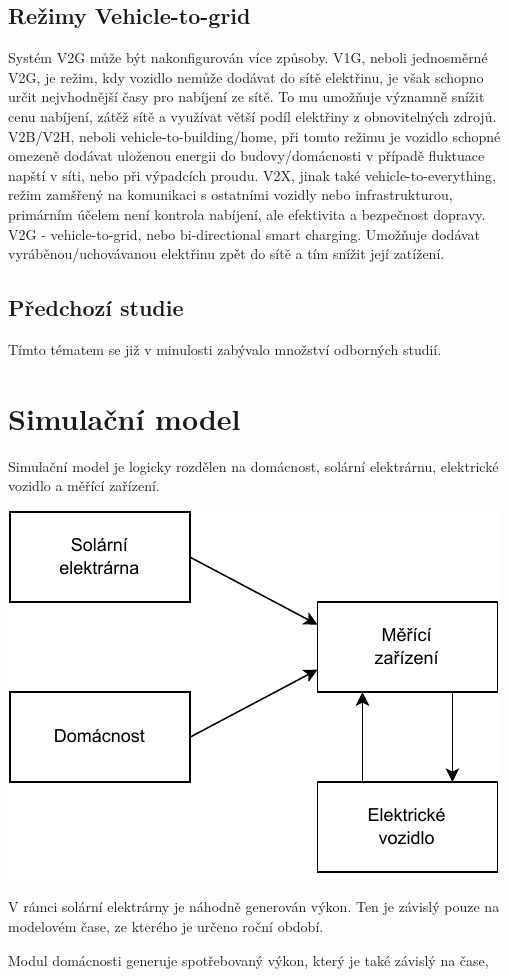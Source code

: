 \documentclass[12pt,a4paper]{article}
\begin{document}
\subsection{Režimy Vehicle-to-grid}
Systém V2G může být nakonfigurován více způsoby.
V1G, neboli jednosměrné V2G, je režim, kdy vozidlo nemůže dodávat do sítě elektřinu,
je však schopno určit nejvhodnější časy pro nabíjení ze sítě. To mu umožňuje významně snížit cenu nabíjení, zátěž sítě a využívat větší podíl elektřiny z obnovitelných zdrojů.
V2B/V2H, neboli vehicle-to-building/home, při tomto režimu je vozidlo schopné omezeně dodávat uloženou energii do budovy/domácnosti v případě fluktuace napští v síti, nebo při výpadcích proudu.
V2X, jinak také vehicle-to-everything, režim zamšřený na komunikaci s ostatními vozidly nebo infrastrukturou, primárním účelem není kontrola nabíjení, ale efektivita a bezpečnost dopravy.
V2G - vehicle-to-grid, nebo bi-directional smart charging. Umožňuje dodávat vyráběnou/uchovávanou elektřinu zpět do sítě a tím snížit její zatížení.

\subsection{Předchozí studie}
Tímto tématem se již v minulosti zabývalo množství odborných studií.

\section{Simulační model}
Simulační model je logicky rozdělen na domácnost, solární elektrárnu, elektrické vozidlo a měřící zařízení.

\bigskip
\includegraphics[width=0.5\linewidth]{img/diagram.pdf}
\bigskip

V rámci solární elektrárny je náhodně generován výkon.
Ten je závislý pouze na modelovém čase, ze kterého je určeno roční období.

Modul domácnosti generuje spotřebovaný výkon, který je také závislý na čase,
\end{document}
